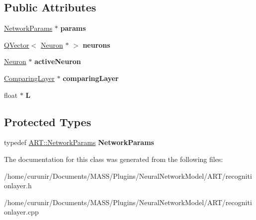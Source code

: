 \subsection*{Public Attributes}
\begin{DoxyCompactItemize}
\item 
\hyperlink{struct_a_r_t_1_1_network_params}{Network\+Params} $\ast$ {\bfseries params}\hypertarget{class_recognition_layer_ad7c8360d3fd4e0b226ebdd59009e0107}{}\label{class_recognition_layer_ad7c8360d3fd4e0b226ebdd59009e0107}

\item 
\hyperlink{class_q_vector}{Q\+Vector}$<$ \hyperlink{class_neuron}{Neuron} $\ast$ $>$ {\bfseries neurons}\hypertarget{class_recognition_layer_a3c49cae5408fe8a168e10d4fa55cfddc}{}\label{class_recognition_layer_a3c49cae5408fe8a168e10d4fa55cfddc}

\item 
\hyperlink{class_neuron}{Neuron} $\ast$ {\bfseries active\+Neuron}\hypertarget{class_recognition_layer_a3447fe282012e286d3f3679e496608a2}{}\label{class_recognition_layer_a3447fe282012e286d3f3679e496608a2}

\item 
\hyperlink{class_comparing_layer}{Comparing\+Layer} $\ast$ {\bfseries comparing\+Layer}\hypertarget{class_recognition_layer_ac09eaecc3fb12d0b4a78ba4afb7e3d29}{}\label{class_recognition_layer_ac09eaecc3fb12d0b4a78ba4afb7e3d29}

\item 
float $\ast$ {\bfseries L}\hypertarget{class_recognition_layer_a0b307b594c9487964fff6b88c7b951c2}{}\label{class_recognition_layer_a0b307b594c9487964fff6b88c7b951c2}

\end{DoxyCompactItemize}
\subsection*{Protected Types}
\begin{DoxyCompactItemize}
\item 
typedef \hyperlink{struct_a_r_t_1_1_network_params}{A\+R\+T\+::\+Network\+Params} {\bfseries Network\+Params}\hypertarget{class_recognition_layer_acde635417a1da14a2dba1ec04542341b}{}\label{class_recognition_layer_acde635417a1da14a2dba1ec04542341b}

\end{DoxyCompactItemize}


The documentation for this class was generated from the following files\+:\begin{DoxyCompactItemize}
\item 
/home/curunir/\+Documents/\+M\+A\+S\+S/\+Plugins/\+Neural\+Network\+Model/\+A\+R\+T/recognitionlayer.\+h\item 
/home/curunir/\+Documents/\+M\+A\+S\+S/\+Plugins/\+Neural\+Network\+Model/\+A\+R\+T/recognitionlayer.\+cpp\end{DoxyCompactItemize}
